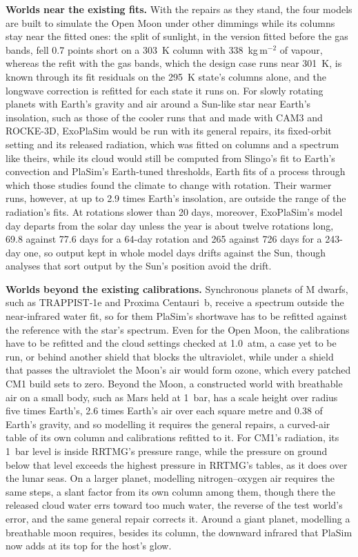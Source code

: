 \textbf{Worlds near the existing fits.} With the repairs as they stand, the four models are built to simulate the
Open Moon under other dimmings while its columns stay near the fitted ones: the split of sunlight, in the version
fitted before the gas bands, fell 0.7 points short on a 303~K column with 338~kg\,m$^{-2}$ of vapour, whereas the
refit with the gas bands, which the design case runs near 301~K, is known through its fit residuals on the 295~K
state's columns alone, and the longwave correction is refitted for each state it runs on. For slowly rotating planets with Earth's gravity and air around a Sun-like star near Earth's insolation,
such as those of the cooler runs that \textcite{yang2014strong} and \textcite{way2018climates} made with CAM3 and
ROCKE-3D, ExoPlaSim would be run with its general repairs, its fixed-orbit setting and its released radiation, which was fitted on columns and a spectrum like theirs, while its cloud would still be computed from Slingo's fit to Earth's convection and PlaSim's Earth-tuned thresholds, Earth fits of a process through which those studies found the climate to change with
rotation. Their warmer runs, however, at up to 2.9 times Earth's insolation, are outside the range of the radiation's fits. At
rotations slower than 20 days, moreover, ExoPlaSim's model day departs from the solar day unless the year is about twelve rotations long, 69.8 against 77.6 days for a 64-day rotation and 265 against 726 days for a 243-day one, so
output kept in whole model days drifts against the Sun, though analyses that sort output by the Sun's position
avoid the drift.

\textbf{Worlds beyond the existing calibrations.} Synchronous planets of M dwarfs, such as TRAPPIST-1e and Proxima
Centauri~b, receive a spectrum outside the near-infrared water fit, so for them PlaSim's shortwave has to be refitted against the reference with the star's spectrum. Even for the Open Moon, the calibrations have to be refitted and the cloud settings checked at 1.0~atm, a case yet to be run, or behind another shield that blocks the ultraviolet, while under a shield
that passes the ultraviolet the Moon's air would form ozone, which every patched CM1 build sets to zero. Beyond the Moon, a
constructed world with breathable air on a small body, such as Mars held at 1~bar, has a scale height over radius
five times Earth's, 2.6 times Earth's air over each square metre and 0.38 of Earth's gravity, and so modelling it requires the general repairs, a curved-air table of its own column and calibrations refitted to it. For CM1's radiation, its 1~bar level is inside RRTMG's pressure range, while the pressure on ground below that level exceeds the highest pressure in RRTMG's tables, as it does over the lunar seas. On a larger planet, modelling nitrogen--oxygen air requires the same steps, a slant
factor from its own column among them, though there the released cloud water errs toward too much water, the
reverse of the test world's error, and the same general repair corrects it. Around a giant planet, modelling a breathable moon requires, besides its column, the downward infrared that PlaSim now adds at its top for the host's glow.

